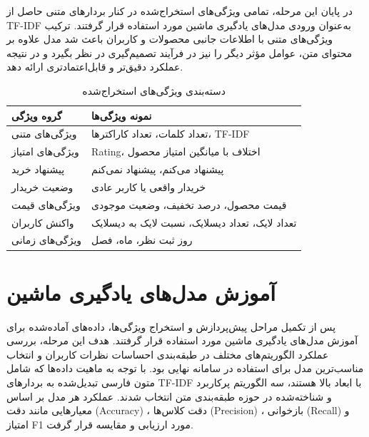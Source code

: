 در پایان این مرحله، تمامی ویژگی‌های استخراج‌شده در کنار بردارهای متنی حاصل از TF-IDF به‌عنوان ورودی مدل‌های یادگیری ماشین مورد استفاده قرار گرفتند. ترکیب ویژگی‌های متنی با اطلاعات جانبی محصولات و کاربران باعث شد مدل علاوه بر محتوای متن، عوامل مؤثر دیگر را نیز در فرآیند تصمیم‌گیری در نظر بگیرد و در نتیجه عملکرد دقیق‌تر و قابل‌اعتمادتری ارائه دهد.
\begin{table}[H]
	\centering
	\caption{دسته‌بندی ویژگی‌های استخراج‌شده}
	\label{tab:feature_groups}
	
	\begin{tabular}{p{4cm} p{9cm}}
		\toprule
		\textbf{گروه ویژگی} & \textbf{نمونه ویژگی‌ها} \\
		\midrule
		
		ویژگی‌های متنی &
		تعداد کلمات، تعداد کاراکترها، TF-IDF \\
		
		ویژگی‌های امتیاز &
		Rating، اختلاف با میانگین امتیاز محصول \\
		
		پیشنهاد خرید &
		پیشنهاد می‌کنم، پیشنهاد نمی‌کنم \\
		
		وضعیت خریدار &
		خریدار واقعی یا کاربر عادی \\
		
		ویژگی‌های قیمت &
		قیمت محصول، درصد تخفیف، وضعیت موجودی \\
		
		واکنش کاربران &
		تعداد لایک، تعداد دیسلایک، نسبت لایک به دیسلایک \\
		
		ویژگی‌های زمانی &
		روز ثبت نظر، ماه، فصل \\
		
		\bottomrule
	\end{tabular}
\end{table}
\section{آموزش مدل‌های یادگیری ماشین}
پس از تکمیل مراحل پیش‌پردازش و استخراج ویژگی‌ها، داده‌های آماده‌شده برای آموزش مدل‌های یادگیری ماشین مورد استفاده قرار گرفتند. هدف این مرحله، بررسی عملکرد الگوریتم‌های مختلف در طبقه‌بندی احساسات نظرات کاربران و انتخاب مناسب‌ترین مدل برای استفاده در سامانه نهایی بود. با توجه به ماهیت داده‌ها که شامل متون فارسی تبدیل‌شده به بردارهای TF-IDF با ابعاد بالا هستند، سه الگوریتم پرکاربرد و شناخته‌شده در حوزه طبقه‌بندی متن انتخاب شدند. عملکرد هر مدل بر اساس معیارهایی مانند دقت (Accuracy) ، دقت کلاس‌ها (Precision) ، بازخوانی (Recall) و امتیاز F1 مورد ارزیابی و مقایسه قرار گرفت.
